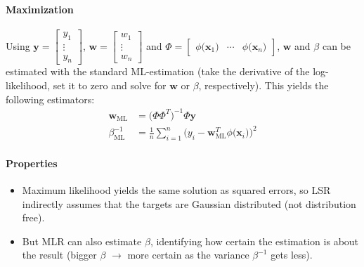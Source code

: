 \documentclass[a4paper, 11pt, accentcolor = tud3b]{tudreport}
\renewcommand{\vec}[1]{\mathbf{#1}}
\begin{document}
				\paragraph{Maximization}
					Using \( \vec{y} = \begin{bmatrix} y_1 \\ \vdots \\ y_n \end{bmatrix} \), \( \vec{w} = \begin{bmatrix} w_1 \\ \vdots \\ w_n \end{bmatrix} \) and \( \Phi = \begin{bmatrix} \phi\big(\vec{x}_1\big) & \cdots & \phi\big(\vec{x}_n\big) \end{bmatrix} \), \(\vec{w}\) and \(\beta\) can be estimated with the standard ML-estimation (take the derivative of the log-likelihood, set it to zero and solve for \(\vec{w}\) or \(\beta\), respectively). This yields the following estimators:
					\begin{align*}
						\vec{w}_\textrm{ML} &= \big(\Phi \Phi^T\big)^{-1} \Phi \vec{y} \\
						\beta_\textrm{ML}^{-1} &= \frac{1}{n} \sum_{i = 1}^{n} \Big(y_i - \vec{w}_\textrm{ML}^T \phi\big(\vec{x}_i\big)\Big)^2
					\end{align*}

				\paragraph{Properties}
					\begin{itemize}
						\item Maximum likelihood yields the same solution as squared errors, so LSR indirectly assumes that the targets are Gaussian distributed (not distribution free).
						\item But MLR can also estimate \(\beta\), identifying how certain the estimation is about the result (bigger \(\beta\) \(\to\) more certain as the variance \(\beta^{-1}\) gets less).
					\end{itemize}
\end{document}
